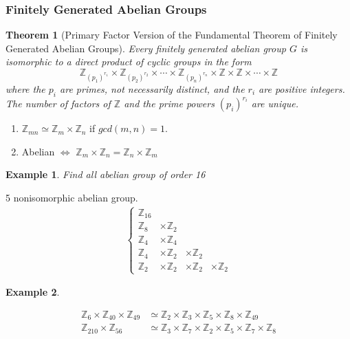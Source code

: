 \documentclass[11pt,a4paper]{article}
\newtheorem{theorem}{Theorem}
\newtheorem{example}{Example}
\begin{document}
\subsubsection{Finitely Generated Abelian Groups}
\begin{theorem}[Primary Factor Version of the Fundamental Theorem of Finitely Generated Abelian Groups]
Every finitely generated abelian group $G$ is isomorphic to a direct product of cyclic groups in the form $$\mathbb{Z}_{(p_1)^{r_1}}\times \mathbb{Z}_{(p_2)^{r_2}}\times \cdots\times \mathbb{Z}_{(p_n)^{r_n}}\times \mathbb{Z}\times \mathbb{Z}\times \cdots \times \mathbb{Z}$$
where the $p_i$ are primes, not necessarily distinct, and the $r_i$ are positive integers. The number of factors of $\mathbb{Z}$ and the prime powers $(p_i)^{r_i}$ are unique.
\end{theorem}
\begin{enumerate}[$\bullet$]
    \item $\mathbb{Z}_{mn}\simeq \mathbb{Z}_m\times \mathbb{Z}_n$ if $gcd(m,n)=1$.
    \item Abelian $\Leftrightarrow$ $\mathbb{Z}_m\times \mathbb{Z}_n=\mathbb{Z}_n\times \mathbb{Z}_m$
\end{enumerate}



\begin{example}
Find all abelian group of order 16
\end{example}
5 nonisomorphic abelian group.
\begin{equation}
    \begin{aligned}
        \left\{\begin{matrix}
            \mathbb{Z}_{16}&&&\\
            \mathbb{Z}_8&\times \mathbb{Z}_2&&\\
            \mathbb{Z}_4&\times\mathbb{Z}_4&&\\
            \mathbb{Z}_4&\times \mathbb{Z}_2&\times \mathbb{Z}_2&\\
            \mathbb{Z}_2&\times \mathbb{Z}_2&\times \mathbb{Z}_2&\times \mathbb{Z}_2
        \end{matrix}\right.
    \end{aligned}
    \nonumber
\end{equation}
\begin{example}
\end{example}
\begin{equation}
    \begin{aligned}
        \mathbb{Z}_{6}\times \mathbb{Z}_{40}\times \mathbb{Z}_{49}&\simeq \mathbb{Z}_2\times \mathbb{Z}_3\times \mathbb{Z}_5\times \mathbb{Z}_8\times \mathbb{Z}_{49}\\
        \mathbb{Z}_{210}\times \mathbb{Z}_{56}&\simeq \mathbb{Z}_3\times \mathbb{Z}_7\times \mathbb{Z}_2\times \mathbb{Z}_5\times \mathbb{Z}_{7}\times \mathbb{Z}_{8}\\
    \end{aligned}
    \nonumber
\end{equation}
\end{document}
